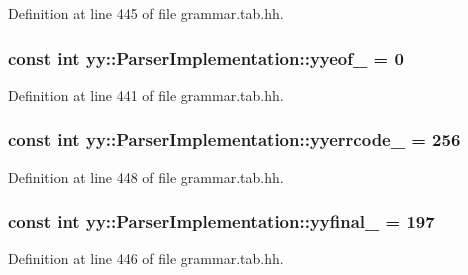 Definition at line 445 of file grammar.tab.hh.

\hypertarget{classyy_1_1_parser_implementation_a100203a99a389f23410e7085f1b89b4a}{
\subsubsection[{yyeof\_\-}]{\setlength{\rightskip}{0pt plus 5cm}const int {\bf yy::ParserImplementation::yyeof\_\-} = 0}}
\label{classyy_1_1_parser_implementation_a100203a99a389f23410e7085f1b89b4a}


Definition at line 441 of file grammar.tab.hh.

\hypertarget{classyy_1_1_parser_implementation_a4e121e871a017ecac45c6ca610f1d274}{
\subsubsection[{yyerrcode\_\-}]{\setlength{\rightskip}{0pt plus 5cm}const int {\bf yy::ParserImplementation::yyerrcode\_\-} = 256}}
\label{classyy_1_1_parser_implementation_a4e121e871a017ecac45c6ca610f1d274}


Definition at line 448 of file grammar.tab.hh.

\hypertarget{classyy_1_1_parser_implementation_a746cd84070b8de7d559eb2c8fc4bedf4}{
\subsubsection[{yyfinal\_\-}]{\setlength{\rightskip}{0pt plus 5cm}const int {\bf yy::ParserImplementation::yyfinal\_\-} = 197}}
\label{classyy_1_1_parser_implementation_a746cd84070b8de7d559eb2c8fc4bedf4}


Definition at line 446 of file grammar.tab.hh.

